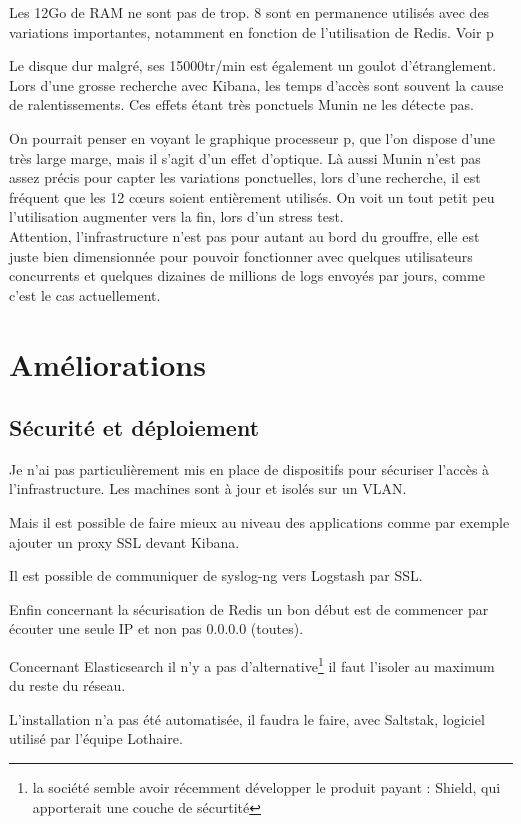 Les 12Go de RAM ne sont pas de trop. 8 sont en permanence utilisés avec des variations
importantes, notamment en fonction de l'utilisation de Redis. Voir p\pageref{fig:elk1memory}

Le disque dur malgré, ses 15000tr/min est également un goulot d'étranglement. Lors
d'une grosse recherche avec Kibana, les temps d'accès sont souvent la cause de ralentissements.
Ces effets étant très ponctuels Munin ne les détecte pas.

On pourrait penser en voyant le graphique processeur p\pageref{fig:elk1cpu}, que 
l'on dispose d'une très large marge, mais il s'agit d'un effet d'optique. 
Là aussi Munin n'est pas assez précis pour capter les variations ponctuelles, 
lors d'une recherche, il est fréquent que les 12 cœurs soient entièrement utilisés.
On voit un tout petit peu l'utilisation augmenter vers la fin, lors d'un stress test.\\[3mm]

Attention, l'infrastructure n'est pas pour autant au bord du grouffre, elle est juste
bien dimensionnée pour pouvoir fonctionner avec quelques utilisateurs concurrents et
quelques dizaines de millions de \gls{logs} envoyés par jours, comme c'est le cas actuellement.


\section{Améliorations}
\subsection{Sécurité et déploiement}
Je n'ai pas particulièrement mis en place de dispositifs pour sécuriser 
l'accès à l'infrastructure. Les machines sont à jour et isolés sur un VLAN. 

Mais il est possible de faire mieux au niveau des applications comme par exemple 
ajouter un proxy SSL devant Kibana.

Il est possible de communiquer de syslog-ng vers Logstash par SSL.

Enfin concernant la sécurisation de Redis un bon début est de commencer par écouter 
une seule IP et non pas  0.0.0.0 (toutes).

Concernant Elasticsearch il n'y a pas d'alternative\footnote{la société semble avoir récemment développer
le produit payant : Shield, qui apporterait une couche de sécurtité} il faut l'isoler au maximum du 
reste du réseau.

L'installation n'a pas été automatisée, il faudra le faire, avec Saltstak, logiciel
utilisé par l'équipe Lothaire.
